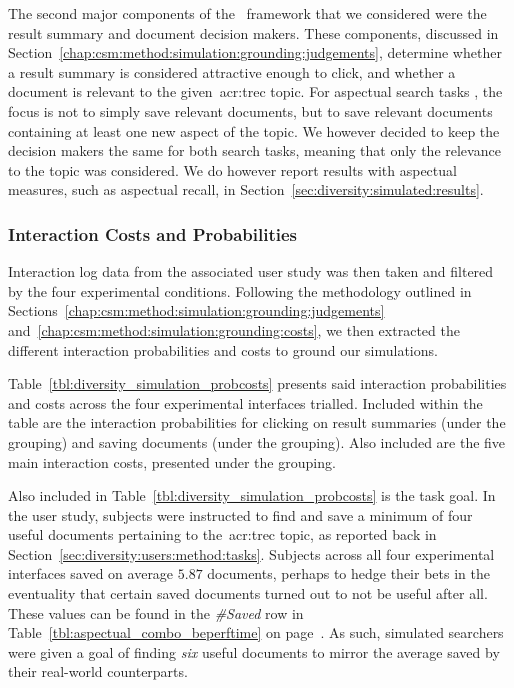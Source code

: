 The second major components of the \simiir~framework that we considered were the result summary and document decision makers. These components, discussed in Section~\ref{chap:csm:method:simulation:grounding:judgements}, determine whether a result summary is considered attractive enough to click, and whether a document is relevant to the given~\gls{acr:trec} topic. For aspectual search tasks , the focus is not to simply save relevant documents, but to save relevant documents containing at least one new aspect of the topic. We however decided to keep the decision makers the same for both search tasks, meaning that only the relevance to the topic was considered. We do however report results with aspectual measures, such as aspectual recall, in Section~\ref{sec:diversity:simulated:results}.

\subsubsection{Interaction Costs and Probabilities}\label{sec:diversity:simulated:method:probscosts}
Interaction log data from the associated user study was then taken and filtered by the four experimental conditions. Following the methodology outlined in Sections~\ref{chap:csm:method:simulation:grounding:judgements} and~\ref{chap:csm:method:simulation:grounding:costs}, we then extracted the different interaction probabilities and costs to ground our simulations.

Table~\ref{tbl:diversity_simulation_probcosts} presents said interaction probabilities and costs across the four experimental interfaces trialled. Included within the table are the interaction probabilities for clicking on result summaries (under the  grouping) and saving documents (under the  grouping). Also included are the five main interaction costs, presented under the  grouping.

Also included in Table~\ref{tbl:diversity_simulation_probcosts} is the task goal. In the user study, subjects were instructed to find and save a minimum of four useful documents pertaining to the~\gls{acr:trec} topic, as reported back in Section~\ref{sec:diversity:users:method:tasks}. Subjects across all four experimental interfaces saved on average $5.87$ documents, perhaps to hedge their bets in the eventuality that certain saved documents turned out to not be useful after all. These values can be found in the \emph{\#Saved} row in Table~\ref{tbl:aspectual_combo_beperftime} on page~\pageref{tbl:aspectual_combo_beperftime}. As such, simulated searchers were given a goal of finding \emph{six} useful documents to mirror the average saved by their real-world counterparts.

